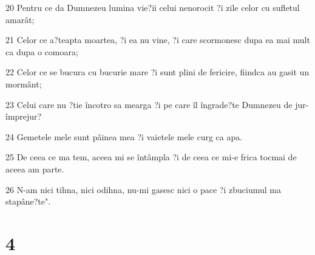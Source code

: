 \par 20 Pentru ce da Dumnezeu lumina vie?ii celui nenorocit ?i zile celor cu sufletul amarât;
\par 21 Celor ce a?teapta moartea, ?i ea nu vine, ?i care scormonesc dupa ea mai mult ca dupa o comoara;
\par 22 Celor ce se bucura cu bucurie mare ?i sunt plini de fericire, fiindca au gasit un mormânt;
\par 23 Celui care nu ?tie încotro sa mearga ?i pe care îl îngrade?te Dumnezeu de jur-împrejur?
\par 24 Gemetele mele sunt pâinea mea ?i vaietele mele curg ca apa.
\par 25 De ceea ce ma tem, aceea mi se întâmpla ?i de ceea ce mi-e frica tocmai de aceea am parte.
\par 26 N-am nici tihna, nici odihna, nu-mi gasesc nici o pace ?i zbuciumul ma stapâne?te".

\chapter{4}

